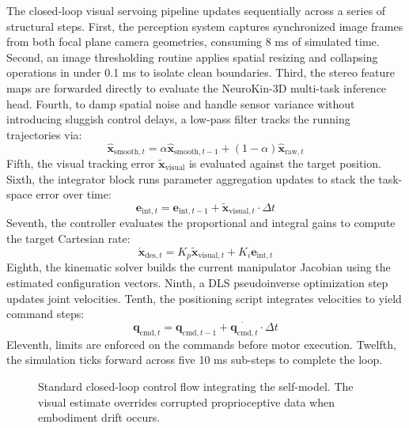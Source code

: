 \documentclass[12pt,a4paper,oneside]{report}
\begin{document}
The closed-loop visual servoing pipeline updates sequentially across a series of structural steps. First, the perception system captures synchronized image frames from both focal plane camera geometries, consuming 8 ms of simulated time. Second, an image thresholding routine applies spatial resizing and collapsing operations in under 0.1 ms to isolate clean boundaries. Third, the stereo feature maps are forwarded directly to evaluate the NeuroKin-3D multi-task inference head. Fourth, to damp spatial noise and handle sensor variance without introducing sluggish control delays, a low-pass filter tracks the running trajectories via:
\begin{equation}
\hat{\mathbf{x}}_{\text{smooth}, t} = \alpha \hat{\mathbf{x}}_{\text{smooth}, t-1} + (1 - \alpha) \hat{\mathbf{x}}_{\text{raw}, t}
\end{equation}
Fifth, the visual tracking error $\tilde{\mathbf{x}}_{\text{visual}}$ is evaluated against the target position. Sixth, the integrator block runs parameter aggregation updates to stack the task-space error over time:
\begin{equation}
\mathbf{e}_{\text{int}, t} = \mathbf{e}_{\text{int}, t-1} + \tilde{\mathbf{x}}_{\text{visual}, t} \cdot \Delta t
\end{equation}
Seventh, the controller evaluates the proportional and integral gains to compute the target Cartesian rate:
\begin{equation}
\dot{\mathbf{x}}_{\text{des}, t} = K_p \tilde{\mathbf{x}}_{\text{visual}, t} + K_i \mathbf{e}_{\text{int}, t}
\end{equation}
Eighth, the kinematic solver builds the current manipulator Jacobian using the estimated configuration vectors. Ninth, a DLS pseudoinverse optimization step updates joint velocities. Tenth, the positioning script integrates velocities to yield command steps:
\begin{equation}
\mathbf{q}_{\text{cmd}, t} = \mathbf{q}_{\text{cmd}, t-1} + \dot{\mathbf{q}_{\text{cmd}, t}} \cdot \Delta t
\end{equation}
Eleventh, limits are enforced on the commands before motor execution. Twelfth, the simulation ticks forward across five 10 ms sub-steps to complete the loop.

\begin{figure}[H]
    \centering
    \caption{Standard closed-loop control flow integrating the self-model. The visual estimate overrides corrupted proprioceptive data when embodiment drift occurs.}
    \label{fig:control_loop}
\end{figure}
\end{document}
